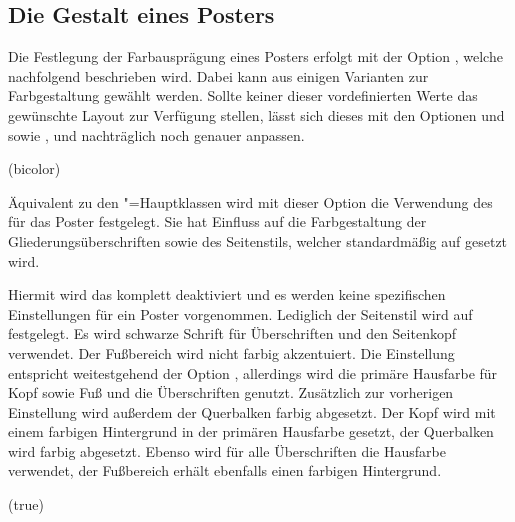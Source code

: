 \begin{DeclareEntity}{}
\subsection{Die Gestalt eines Posters}

Die Festlegung der Farbausprägung eines Posters erfolgt mit der Option 
, welche nachfolgend beschrieben wird. Dabei kann aus einigen 
Varianten zur Farbgestaltung gewählt werden. Sollte keiner dieser 
vordefinierten Werte das gewünschte Layout zur Verfügung stellen, lässt sich 
dieses mit den Optionen  und  sowie 
,  und  nachträglich 
noch genauer anpassen.


\begin{Declaration}
  {}
  (bicolor)

Äquivalent zu den \TUDScript"=Hauptklassen wird mit dieser Option die 
Verwendung des \TUDCDs für das Poster festgelegt. Sie hat Einfluss auf die 
Farbgestaltung der Gliederungsüberschriften sowie des Seitenstils, welcher 
standardmäßig auf  gesetzt wird.
%
\begin{DeclareValues}{}
  Hiermit wird das \CD komplett deaktiviert und es werden keine spezifischen 
  Einstellungen für ein Poster vorgenommen. Lediglich der Seitenstil wird auf 
   festgelegt.
  Es wird schwarze Schrift für Überschriften und den Seitenkopf verwendet. Der 
  Fußbereich wird nicht farbig akzentuiert.
  Die Einstellung entspricht weitestgehend der Option , 
  allerdings wird die primäre Hausfarbe  für Kopf sowie Fuß und 
  die Überschriften genutzt.
  Zusätzlich zur vorherigen Einstellung wird außerdem der Querbalken farbig 
  abgesetzt.
  Der Kopf wird mit einem farbigen Hintergrund in der primären Hausfarbe 
   gesetzt, der Querbalken wird farbig abgesetzt. Ebenso wird für 
  alle Überschriften die Hausfarbe verwendet, der Fußbereich erhält ebenfalls 
  einen farbigen Hintergrund.
\end{DeclareValues}
\end{Declaration}

\begin{Declaration}
  {}
  (true)


\end{Declaration}
\end{DeclareEntity}
